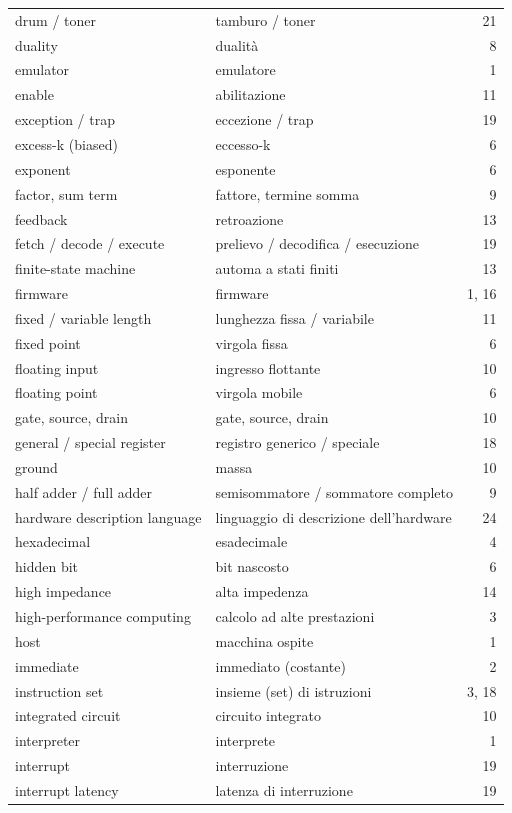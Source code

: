 {\begin{longtable}{@{}p{}p{}r@{}}
drum / toner & tamburo / toner & 21\\
duality & dualità & 8\\
emulator & emulatore & 1\\
enable & abilitazione & 11\\
exception / trap & eccezione / trap & 19\\
excess-k (biased) & eccesso-k & 6\\
exponent & esponente & 6\\
factor, sum term & fattore, termine somma & 9\\
feedback & retroazione & 13\\
fetch / decode / execute & prelievo / decodifica / esecuzione & 19\\
finite-state machine & automa a stati finiti & 13\\
firmware & firmware & 1, 16\\
fixed / variable length & lunghezza fissa / variabile & 11\\
fixed point & virgola fissa & 6\\
floating input & ingresso flottante & 10\\
floating point & virgola mobile & 6\\
gate, source, drain & gate, source, drain & 10\\
general / special register & registro generico / speciale & 18\\
ground & massa & 10\\
half adder / full adder & semisommatore / sommatore completo & 9\\
hardware description language & linguaggio di descrizione dell'hardware & 24\\
hexadecimal & esadecimale & 4\\
hidden bit & bit nascosto & 6\\
high impedance & alta impedenza & 14\\
high-performance computing & calcolo ad alte prestazioni & 3\\
host & macchina ospite & 1\\
immediate & immediato (costante) & 2\\
instruction set & insieme (set) di istruzioni & 3, 18\\
integrated circuit & circuito integrato & 10\\
interpreter & interprete & 1\\
interrupt & interruzione & 19\\
interrupt latency & latenza di interruzione & 19\\

\end{longtable}}
